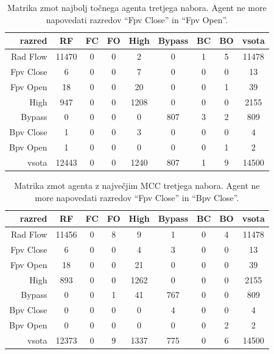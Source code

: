 \begin{table}[H]
    \centering
    \begin{tabular}{||rcccccccc||}
        \hline
        razred    & RF    & FC & FO & High & Bypass & BC & BO & vsota \\ \hline
        Rad Flow  & 11470 & 0  & 0  & 2    & 0      & 1  & 5  & 11478 \\ \hline
        Fpv Close & 6     & 0  & 0  & 7    & 0      & 0  & 0  & 13    \\ \hline
        Fpv Open  & 18    & 0  & 0  & 20   & 0      & 0  & 1  & 39    \\ \hline
        High      & 947   & 0  & 0  & 1208 & 0      & 0  & 0  & 2155  \\ \hline
        Bypass    & 0     & 0  & 0  & 0    & 807    & 3  & 2  & 809   \\ \hline
        Bpv Close & 1     & 0  & 0  & 3    & 0      & 0  & 0  & 4     \\ \hline
        Bpv Open  & 1     & 0  & 0  & 0    & 0      & 0  & 1  & 2     \\ \hline
        vsota     & 12443 & 0  & 0  & 1240 & 807    & 1  & 9  & 14500 \\ \hline
    \end{tabular}
    \caption{Matrika zmot najbolj točnega agenta tretjega nabora. Agent ne more napovedati razredov \enquote{Fpv Close} in \enquote{Fpv Open}.}
    \label{tab:statlog_acc_3}
\end{table}

\begin{table}[H]
    \centering
    \begin{tabular}{||rcccccccc||}
        \hline
        razred    & RF    & FC & FO & High & Bypass & BC & BO & vsota \\ \hline
        Rad Flow  & 11456 & 0  & 8  & 9    & 1      & 0  & 4  & 11478 \\ \hline
        Fpv Close & 6     & 0  & 0  & 4    & 3      & 0  & 0  & 13    \\ \hline
        Fpv Open  & 18    & 0  & 0  & 21   & 0      & 0  & 0  & 39    \\ \hline
        High      & 893   & 0  & 0  & 1262 & 0      & 0  & 0  & 2155  \\ \hline
        Bypass    & 0     & 0  & 1  & 41   & 767    & 0  & 0  & 809   \\ \hline
        Bpv Close & 0     & 0  & 0  & 0    & 4      & 0  & 0  & 4     \\ \hline
        Bpv Open  & 0     & 0  & 0  & 0    & 0      & 0  & 2  & 2     \\ \hline
        vsota     & 12373 & 0  & 9  & 1337 & 775    & 0  & 6  & 14500 \\ \hline
    \end{tabular}
    \caption{Matrika zmot agenta z največjim MCC tretjega nabora. Agent ne more napovedati razredov \enquote{Fpv Close} in \enquote{Bpv Close}.}
    \label{tab:statlog_mcc_3}
\end{table}

